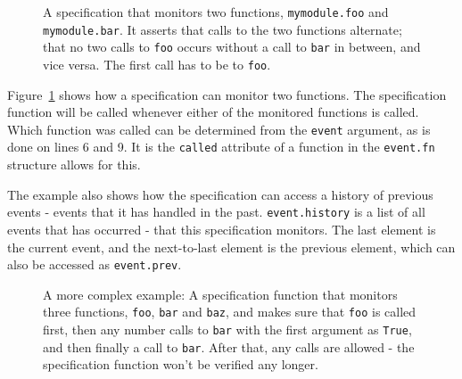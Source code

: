 \documentclass[a4paper,11pt]{kth-mag}
\begin{document}
\begin{figure}[h!]

	\begin{center}
	\begin{minipage}{0.7\textwidth}
	
	\end{minipage}
	\end{center}

	\caption{A specification that monitors two functions, \texttt{mymodule.foo}
	and \texttt{mymodule.bar}. It asserts that calls to the two functions
alternate; that no two calls to \texttt{foo} occurs without a call to
\texttt{bar} in between, and vice versa. The first call has to be to
\texttt{foo}.}
	\label{figure-syntax-example-2}
\end{figure}

Figure~\ref{figure-syntax-example-2} shows how a specification can monitor two
functions. The specification function will be called whenever either of the
monitored functions is called. Which function was called can be determined from
the \texttt{event} argument, as is done on lines 6 and 9. It is the
\texttt{called} attribute of a function in the \texttt{event.fn} structure
allows for this.

The example also shows how the specification can access a history of previous
events - events that it has handled in the past. \texttt{event.history} is a
list of all events that has occurred - that this specification monitors. The
last element is the current event, and the next-to-last element is the previous
element, which can also be accessed as \texttt{event.prev}.

\begin{figure}[h!]

	\begin{center}
	\begin{minipage}{0.7\textwidth}
	
	\end{minipage}
	\end{center}

	\caption{A more complex example: A specification function that monitors three
		functions, \texttt{foo}, \texttt{bar} and \texttt{baz}, and makes sure that
		\texttt{foo} is called first, then any number calls to \texttt{bar} with
		the first argument as \texttt{True}, and then finally a call to
	\texttt{bar}. After that, any calls are allowed - the specification function
won't be verified any longer.}
	\label{figure-syntax-example-3}
\end{figure}
\end{document}
